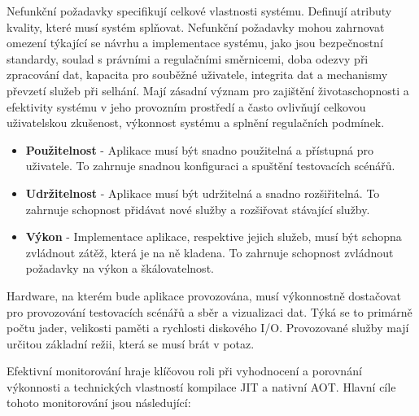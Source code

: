 
Nefunkční požadavky specifikují celkové vlastnosti systému. Definují atributy kvality, které musí systém splňovat. Nefunkční požadavky mohou zahrnovat omezení týkající se návrhu a implementace systému, jako jsou bezpečnostní standardy, soulad s právními a regulačními směrnicemi, doba odezvy při zpracování dat, kapacita pro souběžné uživatele, integrita dat a mechanismy převzetí služeb při selhání. Mají zásadní význam pro zajištění životaschopnosti a efektivity systému v jeho provozním prostředí a často ovlivňují celkovou uživatelskou zkušenost, výkonnost systému a splnění regulačních podmínek.

\begin{itemize}
  \item \textbf{Použitelnost} - Aplikace musí být snadno použitelná a přístupná pro uživatele. To zahrnuje snadnou konfiguraci a spuštění testovacích scénářů.
  \item \textbf{Udržitelnost} - Aplikace musí být udržitelná a snadno rozšiřitelná. To zahrnuje schopnost přidávat nové služby a rozšiřovat stávající služby.
  \item \textbf{Výkon} - Implementace aplikace, respektive jejich služeb, musí být schopna zvládnout zátěž, která je na ně kladena. To zahrnuje schopnost zvládnout požadavky na výkon a škálovatelnost.
\end{itemize}


Hardware, na kterém bude aplikace provozována, musí výkonnostně dostačovat pro provozování testovacích scénářů a sběr a vizualizaci dat. Týká se to primárně počtu jader, velikosti paměti a rychlosti diskového I/O. Provozované služby mají určitou základní režii, která se musí brát v potaz.


Efektivní monitorování hraje klíčovou roli při vyhodnocení a porovnání výkonnosti a technických vlastností kompilace JIT a nativní AOT. Hlavní cíle tohoto monitorování jsou následující:


